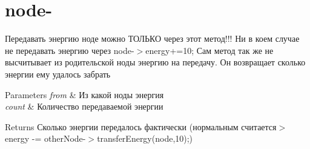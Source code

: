 \hypertarget{node--example}{\section{node-\/}
}
Передавать энергию ноде можно ТОЛЬКО через этот метод!!! Ни в коем случае не передавать энергию через node-\/$>$energy+=10; Сам метод так же не высчитывает из родительской ноды энергию на передачу. Он возвращает сколько энергии ему удалось забрать


\begin{DoxyParams}{Parameters}
{\em from} & Из какой ноды энергия \\
\hline
{\em count} & Количество передаваемой энергии \\
\hline
\end{DoxyParams}
\begin{DoxyReturn}{Returns}
Сколько энергии передалось фактически (нормальным считается$>$energy -\/= other\-Node-\/$>$transfer\-Energy(node,10);)
\end{DoxyReturn}

\begin{DoxyCodeInclude}
\end{DoxyCodeInclude}
 